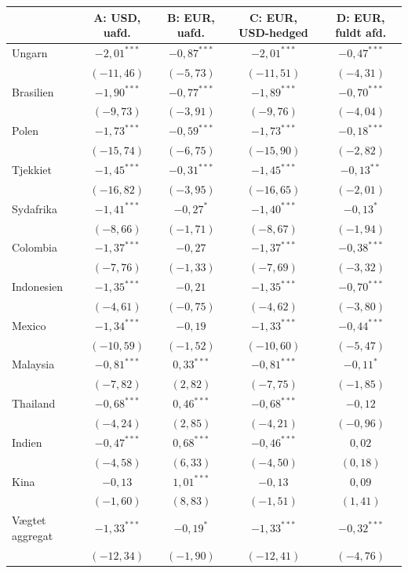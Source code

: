 \begin{tabular}{lcccc}
\toprule
 & A: USD, uafd. & B: EUR, uafd. & C: EUR, USD-hedged & D: EUR, fuldt afd. \\
\midrule
Ungarn & $-2{,}01^{***}$ & $-0{,}87^{***}$ & $-2{,}01^{***}$ & $-0{,}47^{***}$ \\
 & $(-11{,}46)$ & $(-5{,}73)$ & $(-11{,}51)$ & $(-4{,}31)$ \\
Brasilien & $-1{,}90^{***}$ & $-0{,}77^{***}$ & $-1{,}89^{***}$ & $-0{,}70^{***}$ \\
 & $(-9{,}73)$ & $(-3{,}91)$ & $(-9{,}76)$ & $(-4{,}04)$ \\
Polen & $-1{,}73^{***}$ & $-0{,}59^{***}$ & $-1{,}73^{***}$ & $-0{,}18^{***}$ \\
 & $(-15{,}74)$ & $(-6{,}75)$ & $(-15{,}90)$ & $(-2{,}82)$ \\
Tjekkiet & $-1{,}45^{***}$ & $-0{,}31^{***}$ & $-1{,}45^{***}$ & $-0{,}13^{**}$ \\
 & $(-16{,}82)$ & $(-3{,}95)$ & $(-16{,}65)$ & $(-2{,}01)$ \\
Sydafrika & $-1{,}41^{***}$ & $-0{,}27^{*}$ & $-1{,}40^{***}$ & $-0{,}13^{*}$ \\
 & $(-8{,}66)$ & $(-1{,}71)$ & $(-8{,}67)$ & $(-1{,}94)$ \\
Colombia & $-1{,}37^{***}$ & $-0{,}27$ & $-1{,}37^{***}$ & $-0{,}38^{***}$ \\
 & $(-7{,}76)$ & $(-1{,}33)$ & $(-7{,}69)$ & $(-3{,}32)$ \\
Indonesien & $-1{,}35^{***}$ & $-0{,}21$ & $-1{,}35^{***}$ & $-0{,}70^{***}$ \\
 & $(-4{,}61)$ & $(-0{,}75)$ & $(-4{,}62)$ & $(-3{,}80)$ \\
Mexico & $-1{,}34^{***}$ & $-0{,}19$ & $-1{,}33^{***}$ & $-0{,}44^{***}$ \\
 & $(-10{,}59)$ & $(-1{,}52)$ & $(-10{,}60)$ & $(-5{,}47)$ \\
Malaysia & $-0{,}81^{***}$ & $0{,}33^{***}$ & $-0{,}81^{***}$ & $-0{,}11^{*}$ \\
 & $(-7{,}82)$ & $(2{,}82)$ & $(-7{,}75)$ & $(-1{,}85)$ \\
Thailand & $-0{,}68^{***}$ & $0{,}46^{***}$ & $-0{,}68^{***}$ & $-0{,}12$ \\
 & $(-4{,}24)$ & $(2{,}85)$ & $(-4{,}21)$ & $(-0{,}96)$ \\
Indien & $-0{,}47^{***}$ & $0{,}68^{***}$ & $-0{,}46^{***}$ & $0{,}02$ \\
 & $(-4{,}58)$ & $(6{,}33)$ & $(-4{,}50)$ & $(0{,}18)$ \\
Kina & $-0{,}13$ & $1{,}01^{***}$ & $-0{,}13$ & $0{,}09$ \\
 & $(-1{,}60)$ & $(8{,}83)$ & $(-1{,}51)$ & $(1{,}41)$ \\
\midrule
Vægtet aggregat & $-1{,}33^{***}$ & $-0{,}19^{*}$ & $-1{,}33^{***}$ & $-0{,}32^{***}$ \\
 & $(-12{,}34)$ & $(-1{,}90)$ & $(-12{,}41)$ & $(-4{,}76)$ \\
\bottomrule
\end{tabular}

